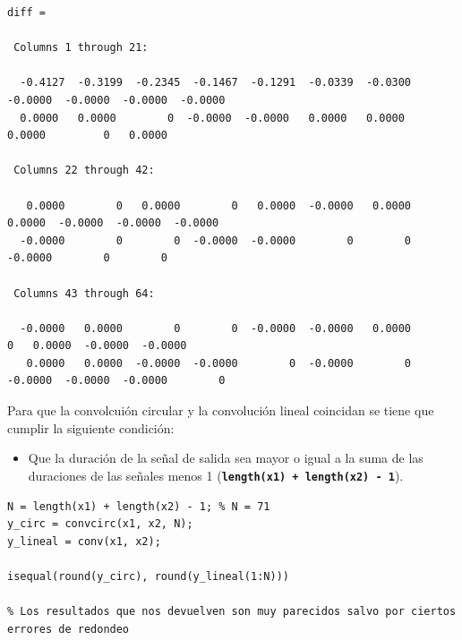 \documentclass{article}
\newcommand{\code}[1]{\texttt{\textbf{#1}}}
\begin{document}
\begin{verbatim}
diff =

 Columns 1 through 21:

  -0.4127  -0.3199  -0.2345  -0.1467  -0.1291  -0.0339  -0.0300  -0.0000  -0.0000  -0.0000  -0.0000 
  0.0000   0.0000        0  -0.0000  -0.0000   0.0000   0.0000   0.0000         0   0.0000

 Columns 22 through 42:

   0.0000        0   0.0000        0   0.0000  -0.0000   0.0000   0.0000  -0.0000  -0.0000  -0.0000
  -0.0000        0        0  -0.0000  -0.0000        0        0  -0.0000        0        0

 Columns 43 through 64:

  -0.0000   0.0000        0        0  -0.0000  -0.0000   0.0000        0   0.0000  -0.0000  -0.0000
   0.0000   0.0000  -0.0000  -0.0000        0  -0.0000        0  -0.0000  -0.0000  -0.0000        0
\end{verbatim}

Para que la convolcuión circular y la convolución lineal coincidan se tiene que cumplir la siguiente condición:
\begin{itemize}
\item Que la duración de la señal de salida sea mayor o igual a la suma de las duraciones de las señales menos 1 \linebreak (\code{length(x1) + length(x2) - 1}). 
\end{itemize}
\begin{lstlisting}
N = length(x1) + length(x2) - 1; % N = 71
y_circ = convcirc(x1, x2, N);
y_lineal = conv(x1, x2);

isequal(round(y_circ), round(y_lineal(1:N)))

% Los resultados que nos devuelven son muy parecidos salvo por ciertos errores de redondeo
\end{lstlisting}
\end{document}
